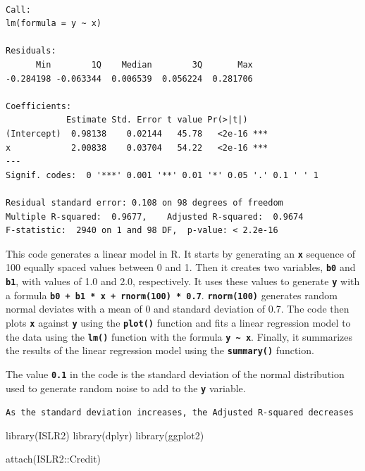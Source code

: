 \documentclass[
  letterpaper,
  DIV=11,
  numbers=noendperiod]{scrartcl}
\newenvironment{Shaded}{\begin{snugshade}}{\end{snugshade}}
\newcommand{\FunctionTok}[1]{\textcolor[rgb]{0.28,0.35,0.67}{#1}}
\newcommand{\NormalTok}[1]{\textcolor[rgb]{0.00,0.23,0.31}{#1}}
\newcommand{\SpecialCharTok}[1]{\textcolor[rgb]{0.37,0.37,0.37}{#1}}
\begin{document}
\begin{verbatim}

Call:
lm(formula = y ~ x)

Residuals:
      Min        1Q    Median        3Q       Max 
-0.284198 -0.063344  0.006539  0.056224  0.281706 

Coefficients:
            Estimate Std. Error t value Pr(>|t|)    
(Intercept)  0.98138    0.02144   45.78   <2e-16 ***
x            2.00838    0.03704   54.22   <2e-16 ***
---
Signif. codes:  0 '***' 0.001 '**' 0.01 '*' 0.05 '.' 0.1 ' ' 1

Residual standard error: 0.108 on 98 degrees of freedom
Multiple R-squared:  0.9677,    Adjusted R-squared:  0.9674 
F-statistic:  2940 on 1 and 98 DF,  p-value: < 2.2e-16
\end{verbatim}

This code generates a linear model in R. It starts by generating an
\textbf{\texttt{x}} sequence of 100 equally spaced values between 0 and
1. Then it creates two variables, \textbf{\texttt{b0}} and
\textbf{\texttt{b1}}, with values of 1.0 and 2.0, respectively. It uses
these values to generate \textbf{\texttt{y}} with a formula
\textbf{\texttt{b0\ +\ b1\ *\ x\ +\ rnorm(100)\ *\ 0.7}}.
\textbf{\texttt{rnorm(100)}} generates random normal deviates with a
mean of 0 and standard deviation of 0.7. The code then plots
\textbf{\texttt{x}} against \textbf{\texttt{y}} using the
\textbf{\texttt{plot()}} function and fits a linear regression model to
the data using the \textbf{\texttt{lm()}} function with the formula
\textbf{\texttt{y\ \textasciitilde{}\ x}}. Finally, it summarizes the
results of the linear regression model using the
\textbf{\texttt{summary()}} function.

The value \textbf{\texttt{0.1}} in the code is the standard deviation of
the normal distribution used to generate random noise to add to the
\textbf{\texttt{y}} variable.

\texttt{As\ the\ standard\ deviation\ increases,\ the\ Adjusted\ R-squared\ decreases}

\begin{Shaded}
\begin{Highlighting}[]
\FunctionTok{library}\NormalTok{(ISLR2)}
\FunctionTok{library}\NormalTok{(dplyr)}
\FunctionTok{library}\NormalTok{(ggplot2)}

\FunctionTok{attach}\NormalTok{(ISLR2}\SpecialCharTok{::}\NormalTok{Credit)}
\end{Highlighting}
\end{Shaded}
\end{document}
